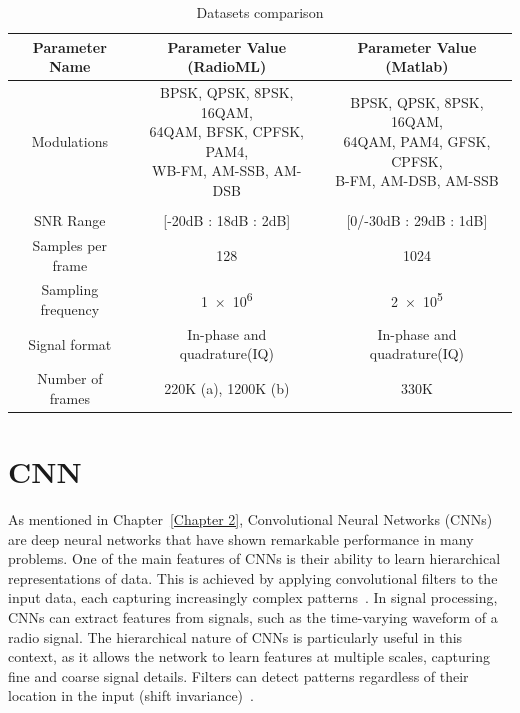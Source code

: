 \begin{table}[h!]
\centering
\begin{tabular}{| c | c | c |} 
 \hline
 Parameter Name & Parameter Value (RadioML) & Parameter Value (Matlab) \\ %
 \hline
 Modulations & \makecell{BPSK, QPSK, 8PSK, 16QAM, \\64QAM, BFSK,  CPFSK, PAM4, \\WB-FM, AM-SSB, AM-DSB} & \makecell{BPSK, QPSK, 8PSK, 16QAM, \\64QAM, PAM4, GFSK, CPFSK, \\B-FM, AM-DSB, AM-SSB} \\
 & & \\
 SNR Range & [-20dB : 18dB : 2dB] & [0/-30dB : 29dB : 1dB] \\

 Samples per frame & 128 & 1024\\
 Sampling frequency & \num{1e6} & \num{2e5}\\
 Signal format & In-phase and quadrature(IQ) & In-phase and quadrature(IQ)\\  
 Number of frames & 220K (a), 1200K (b) & 330K \\ [1ex] 
 \hline
\end{tabular}
\caption{Datasets comparison}
\label{table:datasets}
\end{table}

\section{CNN}
As mentioned in Chapter~\ref{Chapter 2}, Convolutional Neural Networks (CNNs) are deep neural networks that have shown remarkable performance in many problems. One of the main features of CNNs is their ability to learn hierarchical representations of data. This is achieved by applying convolutional filters to the input data, each capturing increasingly complex patterns~\cite{cnn_intro}. In signal processing, CNNs can extract features from signals, such as the time-varying waveform of a radio signal. The hierarchical nature of CNNs is particularly useful in this context, as it allows the network to learn features at multiple scales, capturing fine and coarse signal details. Filters can detect patterns regardless of their location in the input (shift invariance)~\cite{cnn_radio}.
    

